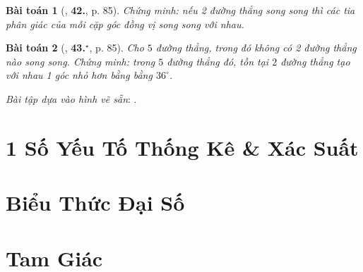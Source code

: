 \documentclass{article}
\numberwithin{equation}{section}
\newtheorem{baitoan}{Bài toán}[section]
\begin{document}
\begin{baitoan}[\cite{Binh_Toan_7_tap_1}, \textbf{42.}, p. 85]
	Chứng minh: nếu 2 đường thẳng song song thì các tia phân giác của mỗi cặp góc đồng vị song song với nhau.
\end{baitoan}

\begin{baitoan}[\cite{Binh_Toan_7_tap_1}, \textbf{43.}${}^\star$, p. 85]
	Cho $5$ đường thẳng, trong đó không có 2 đường thẳng nào song song. Chứng minh: trong $5$ đường thẳng đó, tồn tại $2$ đường thẳng tạo với nhau 1 góc nhỏ hơn bằng bằng $36^\circ$.
\end{baitoan}
\textit{Bài tập dựa vào hình vẽ sẵn}: \cite[\textbf{45.}, p. 87]{Binh_Toan_7_tap_1}.


\section{1 Số Yếu Tố Thống Kê \& Xác Suất}


\section{Biểu Thức Đại Số}


\section{Tam Giác}


\printbibliography[heading=bibintoc]
	
\end{document}
